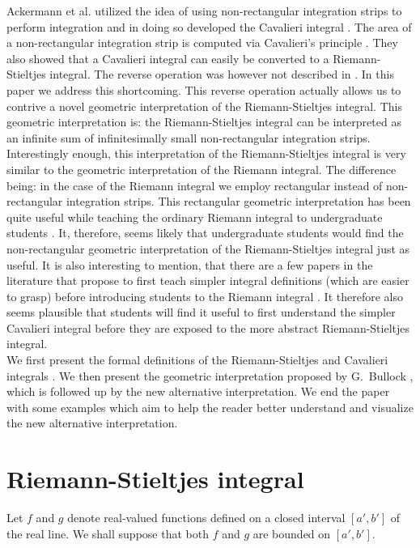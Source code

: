 \documentclass{article}
\theoremstyle{theorem}
\theoremstyle{definition}
\begin{document}
\noindent
Ackermann et al. utilized the idea of using non-rectangular integration strips to perform integration
and in doing so developed the Cavalieri integral \cite{ackermann2012}. The area of a non-rectangular integration strip is computed via 
Cavalieri's principle \cite{andersen1985,eves1991, malik1984, wildberger2002, young1985}. They also showed that a Cavalieri integral can easily be converted to a Riemann-Stieltjes integral. The 
reverse operation was however not described in \cite{ackermann2012}. In this paper we address this shortcoming. This 
reverse operation actually allows us to contrive a novel geometric interpretation of the Riemann-Stieltjes integral.
This geometric interpretation is: the Riemann-Stieltjes integral can be interpreted as an infinite sum of infinitesimally small
non-rectangular integration strips. Interestingly enough, this interpretation of the Riemann-Stieltjes integral is very similar 
to the geometric interpretation of the Riemann integral. The difference being: in the case of the Riemann integral we employ 
rectangular instead of non-rectangular integration strips. This rectangular geometric interpretation has been quite useful while 
teaching the ordinary Riemann integral to undergraduate students \cite{jones2015,sealey2014}. It, therefore, seems likely that undergraduate students would find the non-rectangular geometric interpretation
of the Riemann-Stieltjes integral just as useful. It is also interesting to mention, that there are a few papers in the literature that propose to first 
teach simpler integral definitions (which are easier to grasp) before introducing students to the Riemann integral \cite{czarnocha2001,prabhu2008,ruffa2002,zaskis2014}. It therefore also seems plausible that
students will find it useful to first understand the simpler Cavalieri integral before they are exposed to the more abstract Riemann-Stieltjes integral.\\

\noindent
We first present the formal definitions of the Riemann-Stieltjes and Cavalieri integrals \cite{bartle1976,ackermann2012}.
We then present the geometric interpretation proposed by G.~Bullock \cite{bullock1988}, which is followed up by the new alternative interpretation. We end 
the paper with some examples which aim to help the reader better understand and visualize the new alternative interpretation.

\section{Riemann-Stieltjes integral}
Let $f$ and $g$ denote real-valued functions defined on a closed interval $[a',b']$ of the real line. We shall suppose that 
both $f$ and $g$ are bounded on $[a',b']$. 
\end{document}
